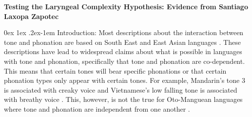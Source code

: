 \documentclass[12pt, letterpaper]{article}
\makeatletter
\renewcommand{\paragraph}{%
  \@startsection{paragraph}{4}%
  {\z@}{0ex \@plus 1ex \@minus .2ex}{-1em}%
  {\normalfont\normalsize\bfseries}%
}
\makeatother
\begin{document}
	

	
	
\begin{center}
	\textbf{Testing the Laryngeal Complexity Hypothesis: Evidence from Santiago Laxopa Zapotec}
\end{center}
\thispagestyle{empty}

\paragraph{Introduction:}
Most descriptions about the interaction between tone and phonation are based on South East and East Asian languages \citep[e.g.,][]{masicaDefiningLinguisticArea1976,thurgoodVietnameseTonogenesisRevising2002,michaudComplexTonesEast2012,brunelleTonePhonationSoutheast2016,kuangCovariationVoiceQuality2017}.
These descriptions have lead to widespread claims about what is possible in languages with tone and phonation, specifically that tone and phonation are co-dependent. 
This means that certain tones will bear specific phonations or that certain phonation types only appear with certain tones. 
For example, Mandarin's tone 3 is associated with creaky voice \citep{hockettPeipingPhonology1947} and Vietnamese's low falling tone is associated with breathy voice \citep{thurgoodVietnameseTonogenesisRevising2002}.
This, however, is not the true for Oto-Manguean languages where tone and phonation are independent from one another \citep{silvermanLaryngealComplexityOtomanguean1997}.
\end{document}
